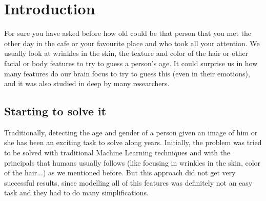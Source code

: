 \documentclass{article}
\title{\papertitle}
\begin{document}
%
\capstartfalse
\maketitle
\capstarttrue

\tableofcontents


\begin{abstract}
In this paper we introduce ourselves into the understanding of how we try to guess the age of a person just by looking at them and how this was tried to be implemented with different approaches of Machine Learning. We also see the results of my own approach with Convolutional Neural Networks (CNN), whose code it is provided in the references\cite{luis2021ageDetector}.
\end{abstract}




\section{Introduction}\label{sec:introduction}

For sure you have asked before how old could be that person that you met the other day in the cafe or your favourite place and who took all your attention. We usually look at wrinkles in the skin, the texture and color of the hair or other facial or body features to try to guess a person's age. It could surprise us in how many features do our brain focus to try to guess this (even in their emotions\cite{monk2003adolescent}), and it was also studied in deep by many researchers\cite{aylward2005brain}.

\subsection{Starting to solve it}
Traditionally, detecting the age and gender of a person given an image of him or she has been an exciting task to solve along years. Initially, the problem was tried to be solved with traditional Machine Learning techniques\cite{wallinga2002detection} and with the principals that humans usually follows (like focusing in wrinkles in the skin, color of the hair...) as we mentioned before. But this approach did not get very successful results, since modelling all of this features was definitely not an easy task and they had to do many simplifications.
\end{document}
